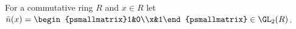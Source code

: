 For a commutative ring $R$ and $x\in R$ let $\bar n(x)=\begin{psmallmatrix}1&0\\x&1\end{psmallmatrix}\in\GL_2(R)$.

